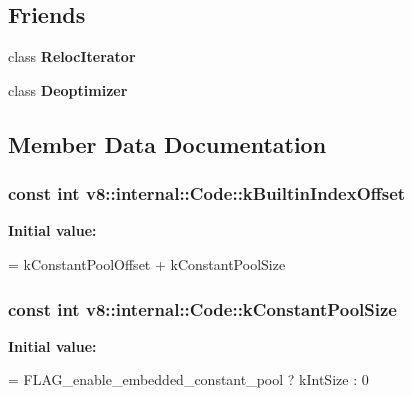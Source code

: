 \subsection*{Friends}
\begin{DoxyCompactItemize}
\item 
class {\bfseries Reloc\+Iterator}\hypertarget{classv8_1_1internal_1_1_code_a9ff673d9f08f4ce3738760e4e66dc88a}{}\label{classv8_1_1internal_1_1_code_a9ff673d9f08f4ce3738760e4e66dc88a}

\item 
class {\bfseries Deoptimizer}\hypertarget{classv8_1_1internal_1_1_code_aa89911581cd6ded032f998021aef9e5c}{}\label{classv8_1_1internal_1_1_code_aa89911581cd6ded032f998021aef9e5c}

\end{DoxyCompactItemize}


\subsection{Member Data Documentation}
\subsubsection[{\texorpdfstring{k\+Builtin\+Index\+Offset}{kBuiltinIndexOffset}}]{\setlength{\rightskip}{0pt plus 5cm}const int v8\+::internal\+::\+Code\+::k\+Builtin\+Index\+Offset\hspace{0.3cm}{\ttfamily [static]}}\hypertarget{classv8_1_1internal_1_1_code_a8ef888f291f8c7a9d23b9579805d95b2}{}\label{classv8_1_1internal_1_1_code_a8ef888f291f8c7a9d23b9579805d95b2}
{\bfseries Initial value\+:}
\begin{DoxyCode}
=
      kConstantPoolOffset + kConstantPoolSize
\end{DoxyCode}
\subsubsection[{\texorpdfstring{k\+Constant\+Pool\+Size}{kConstantPoolSize}}]{\setlength{\rightskip}{0pt plus 5cm}const int v8\+::internal\+::\+Code\+::k\+Constant\+Pool\+Size\hspace{0.3cm}{\ttfamily [static]}}\hypertarget{classv8_1_1internal_1_1_code_a99d36e1c5f253e02099f19cdddff3352}{}\label{classv8_1_1internal_1_1_code_a99d36e1c5f253e02099f19cdddff3352}
{\bfseries Initial value\+:}
\begin{DoxyCode}
=
      FLAG\_enable\_embedded\_constant\_pool ? kIntSize : 0
\end{DoxyCode}
